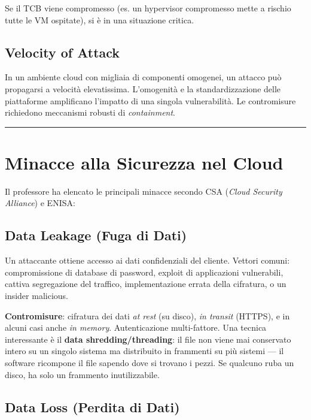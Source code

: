 \documentclass[
  italian,
  openany]{book}
\begin{document}
Se il TCB viene compromesso (es. un hypervisor compromesso mette a
rischio tutte le VM ospitate), si è in una situazione critica.

\subsection{Velocity of Attack}\label{velocity-of-attack}

In un ambiente cloud con migliaia di componenti omogenei, un attacco può
propagarsi a velocità elevatissima. L'omogenità e la standardizzazione
delle piattaforme amplificano l'impatto di una singola vulnerabilità. Le
contromisure richiedono meccanismi robusti di \emph{containment}.

\begin{center}\rule{0.5\linewidth}{0.5pt}\end{center}

\section{Minacce alla Sicurezza nel
Cloud}\label{minacce-alla-sicurezza-nel-cloud}

Il professore ha elencato le principali minacce secondo CSA (\emph{Cloud
Security Alliance}) e ENISA:

\subsection{Data Leakage (Fuga di
Dati)}\label{data-leakage-fuga-di-dati}

Un attaccante ottiene accesso ai dati confidenziali del cliente. Vettori
comuni: compromissione di database di password, exploit di applicazioni
vulnerabili, cattiva segregazione del traffico, implementazione errata
della cifratura, o un insider malicious.

\textbf{Contromisure}: cifratura dei dati \emph{at rest} (su disco),
\emph{in transit} (HTTPS), e in alcuni casi anche \emph{in memory}.
Autenticazione multi-fattore. Una tecnica interessante è il \textbf{data
shredding/threading}: il file non viene mai conservato intero su un
singolo sistema ma distribuito in frammenti su più sistemi --- il
software ricompone il file sapendo dove si trovano i pezzi. Se qualcuno
ruba un disco, ha solo un frammento inutilizzabile.

\subsection{Data Loss (Perdita di
Dati)}\label{data-loss-perdita-di-dati}
\end{document}
